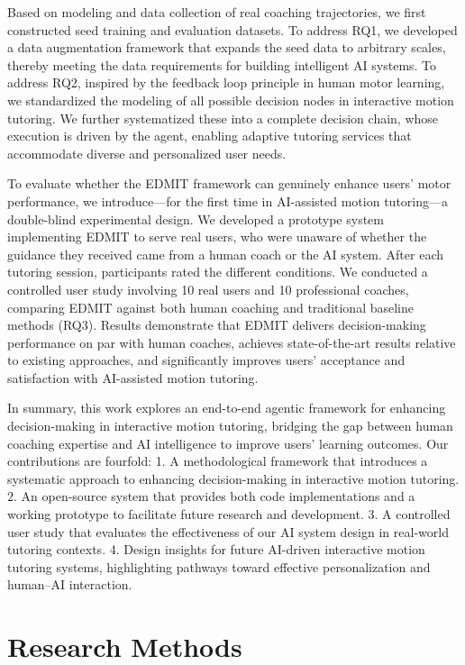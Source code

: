 \documentclass[sigconf]{acmart}
\begin{document}
Based on modeling and data collection of real coaching trajectories, we first constructed seed training and evaluation datasets. To address RQ1, we developed a data augmentation framework that expands the seed data to arbitrary scales, thereby meeting the data requirements for building intelligent AI systems. To address RQ2, inspired by the feedback loop principle in human motor learning, we standardized the modeling of all possible decision nodes in interactive motion tutoring. We further systematized these into a complete decision chain, whose execution is driven by the agent, enabling adaptive tutoring services that accommodate diverse and personalized user needs.

To evaluate whether the EDMIT framework can genuinely enhance users’ motor performance, we introduce—for the first time in AI-assisted motion tutoring—a double-blind experimental design. We developed a prototype system implementing EDMIT to serve real users, who were unaware of whether the guidance they received came from a human coach or the AI system. After each tutoring session, participants rated the different conditions. We conducted a controlled user study involving 10 real users and 10 professional coaches, comparing EDMIT against both human coaching and traditional baseline methods (RQ3). Results demonstrate that EDMIT delivers decision-making performance on par with human coaches, achieves state-of-the-art results relative to existing approaches, and significantly improves users’ acceptance and satisfaction with AI-assisted motion tutoring.

In summary, this work explores an end-to-end agentic framework for enhancing decision-making in interactive motion tutoring, bridging the gap between human coaching expertise and AI intelligence to improve users’ learning outcomes. Our contributions are fourfold:
	1.	A methodological framework that introduces a systematic approach to enhancing decision-making in interactive motion tutoring.
	2.	An open-source system that provides both code implementations and a working prototype to facilitate future research and development.
	3.	A controlled user study that evaluates the effectiveness of our AI system design in real-world tutoring contexts.
	4.	Design insights for future AI-driven interactive motion tutoring systems, highlighting pathways toward effective personalization and human–AI interaction.





\appendix

\section{Research Methods}
\end{document}
